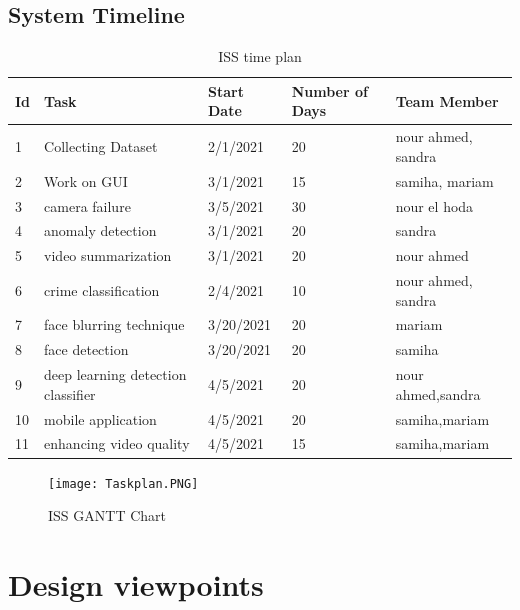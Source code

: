 \documentclass[12pt]{article}
\begin{document}
\subsection {System Timeline}

\begin{table}[htbp]
\centering
\caption{ISS time plan}
\label{tab:Time Plan}


\begin{tabular}{|l|l|l|l|l|}
\hline
Id & Task               & Start Date & Number of Days & Team Member \\ \hline
1  & Collecting Dataset    & 2/1/2021 & 20           & nour ahmed, sandra        \\ \hline
2  & Work on GUI        & 3/1/2021 & 15             & samiha, mariam        \\ \hline
3  & camera failure    & 3/5/2021 & 30              & nour el hoda          \\ \hline
4  &  anomaly detection & 3/1/2021 &20             & sandra    \\ \hline
5  & video summarization     & 3/1/2021 & 20             & nour ahmed           \\ \hline

6 & crime classification     & 2/4/2021 & 10    & nour ahmed, sandra          \\ \hline
7 &   face blurring technique  & 3/20/2021 & 20             & mariam     \\ \hline
8 &   face detection    & 3/20/2021 & 20             & samiha    \\ \hline
9 &  deep learning detection classifier    & 4/5/2021 & 20             & nour ahmed,sandra    \\ \hline
10 & mobile application    & 4/5/2021 & 20             & samiha,mariam    \\ \hline
11 & enhancing video quality   & 4/5/2021 & 15             & samiha,mariam          \\ \hline

\hline
\end{tabular}
\end{table}

\begin{figure}[htbp]
\centering
\texttt{[image: Taskplan.PNG]}
\caption{ISS GANTT Chart}
\label{fig:GANTT Chart}
\end{figure}

\clearpage
\section{Design viewpoints} 
\end{document}
